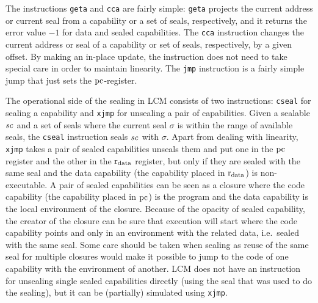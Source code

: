 \documentclass[acmsmall,review,anonymous]{acmart}\settopmatter{printfolios=true,printccs=false,printacmref=false}
\newcommand{\trgcm}{\textsc{LCM}}
\begin{document}
The instructions \texttt{geta} and \texttt{cca} are fairly simple: \texttt{geta} projects the current address or current seal from a capability or a set of seals, respectively, and it returns the error value $-1$ for data and sealed capabilities.
The \texttt{cca} instruction changes the current address or seal of a capability or set of seals, respectively, by a given offset.
By making an in-place update, the instruction does not need to take special care in order to maintain linearity.
The \texttt{jmp} instruction is a fairly simple jump that just sets the $\mathrm{pc}$-register.

The operational side of the sealing in \trgcm{} consists of two instructions: \texttt{cseal} for sealing a capability and \texttt{xjmp} for unsealing a pair of capabilities.
Given a sealable $\mathit{sc}$ and a set of seals where the current seal $\sigma$ is within the range of available seals, the \texttt{cseal} instruction seals $\mathit{sc}$ with $\sigma$.
Apart from dealing with linearity, \texttt{xjmp} takes a pair of sealed capabilities unseals them and put one in the $\mathrm{pc}$ register and the other in the $\mathrm{r}_\mathrm{data}$ register, but only if they are sealed with the same seal and the data capability (the capability placed in $\mathrm{r}_\mathrm{data}$) is non-executable.
A pair of sealed capabilities can be seen as a closure where the code capability (the capability placed in $\mathrm{pc}$) is the program and the data capability is the local environment of the closure.
Because of the opacity of sealed capability, the creator of the closure can be sure that execution will start where the code capability points and only in an environment with the related data, i.e.\ sealed with the same seal.
Some care should be taken when sealing as reuse of the same seal for multiple closures would make it possible to jump to the code of one capability with the environment of another.
\trgcm{} does not have an instruction for unsealing single sealed capabilities directly (using the seal that was used to do the sealing), but it can be (partially) simulated using \texttt{xjmp}.
\end{document}
